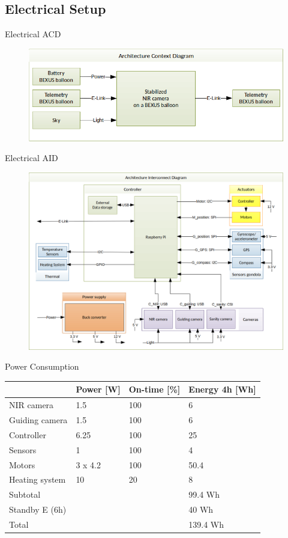 \documentclass[11pt, aspectratio=169]{beamer}
\begin{document}
\subsection{Electrical Setup}	%
\begin{frame}[c]{Electrical ACD}
\centering
\begin{figure}
	\includegraphics[width=.8\textwidth]{figures/images/elec_ACD.png}
\end{figure}
\end{frame}

\begin{frame}{Electrical AID}
\begin{figure}
	\includegraphics[width=.65\textwidth]{figures/images/elec_AID.png}
\end{figure}
\end{frame}

\begin{frame}{Power Consumption}
\centering
	\begin{tabular}{| l | l | l | l |}
	\hline
	& \textbf{Power [W]} & \textbf{On-time [\%]} & \textbf{Energy 4h [Wh]} \\\hline\hline
	NIR camera 		& 1.5	 	& 100 & 6 		\\\hline
	Guiding camera 	& 1.5 		& 100 & 6		\\\hline
	Controller 		& 6.25 		& 100 & 25		\\\hline
	Sensors 		& 1			& 100 & 4		\\\hline
	Motors			& 3 x 4.2	& 100 & 50.4	\\\hline
	Heating system 	& 10		& 20  & 8		\\\hline\hline
	
	Subtotal 		& & 			  & 99.4 Wh \\\hline\hline
	
	Standby E (6h) 	& & 			  & 40 Wh	\\\hline\hline
	
	Total			& & 			  & 139.4 Wh\\\hline
	\end{tabular}
\end{frame}
\end{document}
